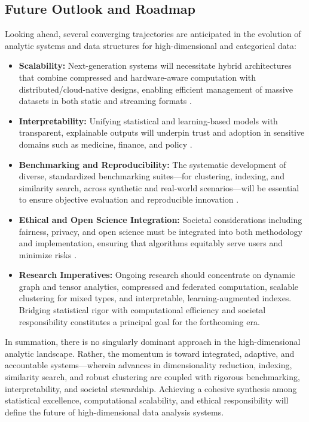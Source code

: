 \subsection{Future Outlook and Roadmap}

Looking ahead, several converging trajectories are anticipated in the evolution of analytic systems and data structures for high-dimensional and categorical data:

\begin{itemize}
    \item \textbf{Scalability:} Next-generation systems will necessitate hybrid architectures that combine compressed and hardware-aware computation with distributed/cloud-native designs, enabling efficient management of massive datasets in both static and streaming formats \cite{ref84,ref87}.
    \item \textbf{Interpretability:} Unifying statistical and learning-based models with transparent, explainable outputs will underpin trust and adoption in sensitive domains such as medicine, finance, and policy \cite{ref110,ref116}.
    \item \textbf{Benchmarking and Reproducibility:} The systematic development of diverse, standardized benchmarking suites—for clustering, indexing, and similarity search, across synthetic and real-world scenarios—will be essential to ensure objective evaluation and reproducible innovation \cite{ref116}.
    \item \textbf{Ethical and Open Science Integration:} Societal considerations including fairness, privacy, and open science must be integrated into both methodology and implementation, ensuring that algorithms equitably serve users and minimize risks \cite{ref117,ref118}.
    \item \textbf{Research Imperatives:} Ongoing research should concentrate on dynamic graph and tensor analytics, compressed and federated computation, scalable clustering for mixed types, and interpretable, learning-augmented indexes. Bridging statistical rigor with computational efficiency and societal responsibility constitutes a principal goal for the forthcoming era.
\end{itemize}

In summation, there is no singularly dominant approach in the high-dimensional analytic landscape. Rather, the momentum is toward integrated, adaptive, and accountable systems—wherein advances in dimensionality reduction, indexing, similarity search, and robust clustering are coupled with rigorous benchmarking, interpretability, and societal stewardship. Achieving a cohesive synthesis among statistical excellence, computational scalability, and ethical responsibility will define the future of high-dimensional data analysis systems.

